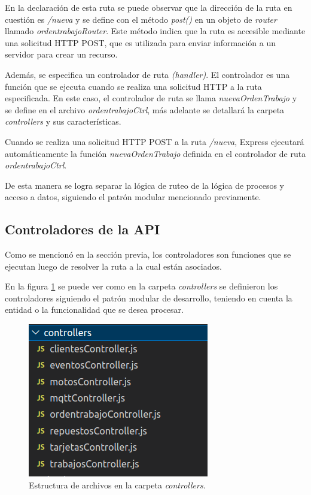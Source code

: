 En la declaración de esta ruta se puede observar que la dirección de la ruta en cuestión es \textit{/nueva} y se define con el método \textit{post()} en un objeto de \textit{router} llamado \textit{ordentrabajoRouter}. Este método indica que la ruta es accesible mediante una solicitud HTTP POST, que es utilizada para enviar información a un servidor para crear un recurso.

Además, se especifica un controlador de ruta \textit{(handler)}. El controlador es una función que se ejecuta cuando se realiza una solicitud HTTP a la ruta especificada. En este caso, el controlador de ruta se llama \textit{nuevaOrdenTrabajo} y se define en el archivo \textit{ordentrabajoCtrl}, más adelante se detallará la carpeta \textit{controllers} y sus características.

Cuando se realiza una solicitud HTTP POST a la ruta \textit{/nueva}, Express ejecutará automáticamente la función \textit{nuevaOrdenTrabajo} definida en el controlador de ruta \textit{ordentrabajoCtrl}.

De esta manera se logra separar la lógica de ruteo de la lógica de procesos y acceso a datos, siguiendo el patrón modular mencionado previamente.

\subsection{Controladores de la API}
\label{subsec:apicontrollers}

Como se mencionó en la sección previa, los controladores son funciones que se ejecutan luego de resolver la ruta a la cual están asociados. 

En la figura \ref{fig:apicontrollers} se puede ver como en la carpeta \textit{controllers} se definieron los controladores siguiendo el patrón modular de desarrollo, teniendo en cuenta la entidad o la funcionalidad que se desea procesar.

\begin{figure}[ht]
	\centering
	\includegraphics[scale=.50]{./Figures/api-controllers.png}
	\caption{Estructura de archivos en la carpeta \textit{controllers}.}
	\label{fig:apicontrollers}
	
\end{figure}

